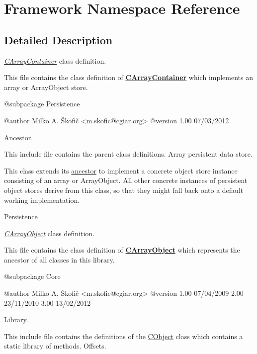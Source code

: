\hypertarget{namespace_framework}{\section{Framework Namespace Reference}
\label{namespace_framework}
}


\subsection{Detailed Description}
{\itshape \hyperlink{class_c_array_container}{C\-Array\-Container}\/} class definition.

This file contains the class definition of {\bfseries \hyperlink{class_c_array_container}{C\-Array\-Container}} which implements an array or Array\-Object store.

\begin{DoxyVerb}    @subpackage     Persistence

    @author         Milko A. Škofič <m.skofic@cgiar.org>
    @version        1.00 07/03/2012\end{DoxyVerb}


Ancestor.

This include file contains the parent class definitions. Array persistent data store.

This class extends its \hyperlink{class_c_container}{ancestor} to implement a concrete object store instance consisting of an array or Array\-Object. All other concrete instances of persistent object stores derive from this class, so that they might fall back onto a default working implementation.

Persistence

{\itshape \hyperlink{class_c_array_object}{C\-Array\-Object}\/} class definition.

This file contains the class definition of {\bfseries \hyperlink{class_c_array_object}{C\-Array\-Object}} which represents the ancestor of all classes in this library.

\begin{DoxyVerb}    @subpackage     Core

    @author         Milko A. Škofič <m.skofic@cgiar.org>
    @version        1.00 07/04/2009
                            2.00 23/11/2010
                            3.00 13/02/2012\end{DoxyVerb}


Library.

This include file contains the definitions of the \hyperlink{class_c_object}{C\-Object} class which contains a static library of methods. Offsets.

